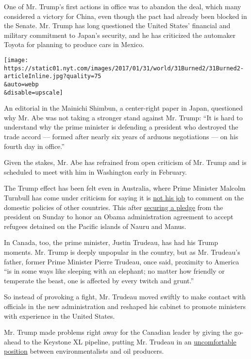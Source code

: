 One of Mr. Trump's first actions in office was to abandon the deal,
which many considered a victory for China, even though the pact had
already been blocked in the Senate. Mr. Trump has long questioned the
United States' financial and military commitment to Japan's security,
and he has criticized the automaker Toyota for planning to produce cars
in Mexico.

\texttt{[image: https://static01.nyt.com/images/2017/01/31/world/31Burned2/31Burned2-articleInline.jpg?quality=75\\\&auto=webp\\\&disable=upscale]}

An editorial in the Mainichi Shimbun, a center-right paper in Japan,
questioned why Mr. Abe was not taking a stronger stand against Mr.
Trump: ``It is hard to understand why the prime minister is defending a
president who destroyed the trade accord --- formed after nearly six
years of arduous negotiations --- on his fourth day in office.''

Given the stakes, Mr. Abe has refrained from open criticism of Mr. Trump
and is scheduled to meet with him in Washington early in February.

The Trump effect has been felt even in Australia, where Prime Minister
Malcolm Turnbull has come under criticism for saying it is
\href{http://www.abc.net.au/news/2017-01-30/turnbull-refuses-comment-on-trump-travel-ban/8222616}{not
his job} to comment on the domestic policies of other countries. This
after
\href{https://mobile.nytimes.com/2017/01/30/world/australia/trump-us-refugee-manus-nauru.html}{securing
a pledge} from the president on Sunday to honor an Obama administration
agreement to accept refugees detained on the Pacific islands of Nauru
and Manus.

In Canada, too, the prime minister, Justin Trudeau, has had his Trump
moments. Mr. Trump is deeply unpopular in the country, but as Mr.
Trudeau's father, former Prime Minister Pierre Trudeau, once said,
proximity to America ``is in some ways like sleeping with an elephant;
no matter how friendly or temperate the beast, one is affected by every
twitch and grunt.''

So instead of provoking a fight, Mr. Trudeau moved swiftly to make
contact with officials in the new administration and reshaped his
cabinet to promote ministers with experience in the United States.

Mr. Trump made problems right away for the Canadian leader by giving the
go-ahead to the Keystone XL pipeline, putting Mr. Trudeau in an
\href{https://www.nytimes.com/2017/01/25/world/canada/canada-justin-trudeau-keystone-xl.html}{uncomfortable
position} between environmentalists and oil producers.

